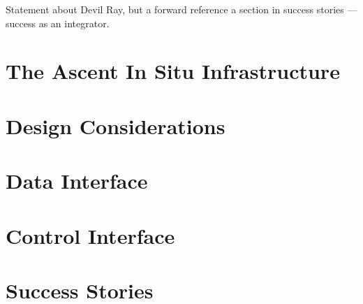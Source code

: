 Statement about Devil Ray, but a forward reference a section in success stories --- success as an integrator.
\fi


\section{The Ascent In Situ Infrastructure}
\label{ascent_overview}


\section{Design Considerations}
\label{ascent_design_considerations}



\section{Data Interface}
\label{ascent_data}


\section{Control Interface}
\label{ascent_control}


\section{Success Stories}
\label{ascent_success}
